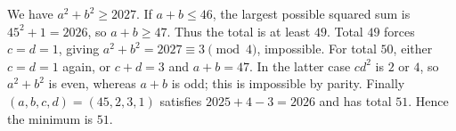 We have $a^2+b^2\ge2027$. If $a+b\le46$, the largest possible squared sum is $45^2+1=2026$, so $a+b\ge47$. Thus the total is at least $49$. Total $49$ forces $c=d=1$, giving $a^2+b^2=2027\equiv3\pmod4$, impossible. For total $50$, either $c=d=1$ again, or $c+d=3$ and $a+b=47$. In the latter case $cd^2$ is $2$ or $4$, so $a^2+b^2$ is even, whereas $a+b$ is odd; this is impossible by parity. Finally $(a,b,c,d)=(45,2,3,1)$ satisfies $2025+4-3=2026$ and has total $51$. Hence the minimum is $\boxed{51}$.
